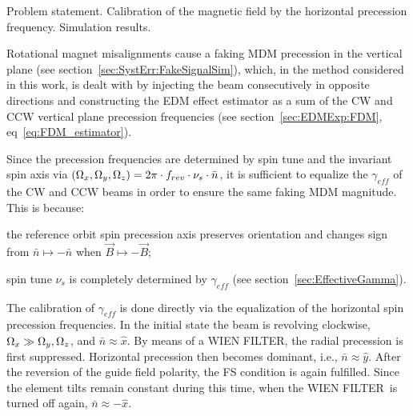 \documentclass{article}
\newcommand{\SUPPRESSOR}{WIEN FILTER}
\begin{document}
Problem statement. Calibration of the magnetic field by the horizontal precession frequency. Simulation results.
\newpage

Rotational magnet misalignments cause a faking MDM precession in the vertical plane (see section~\ref{sec:SystErr:FakeSignalSim}), which, in the method considered in this work, is dealt with by injecting the beam consecutively in opposite directions and constructing the EDM effect estimator as a sum of the CW and CCW vertical plane precession frequencies (see section~\ref{sec:EDMExp:FDM}, eq~\eqref{eq:FDM_estimator}).

Since the precession frequencies are determined by spin tune and the invariant spin axis via $(\Omega_x, \Omega_y, \Omega_z) = 2\pi\cdot f_{rev} \cdot \nu_s \cdot \bar n$, it is sufficient to equalize the $\gamma_{eff}$ of the CW and CCW beams in order to ensure the same faking MDM magnitude. This is because:
\begin{inparaenum}
\item the reference orbit spin precession axis preserves orientation and changes sign from $\bar n \mapsto -\bar n$ when $\vec B \mapsto -\vec B$;
\item spin tune $\nu_s$ is completely determined by $\gamma_{eff}$ (see section~\ref{sec:EffectiveGamma}).
\end{inparaenum}

The calibration of $\gamma_{eff}$ is done directly via the equalization of the horizontal spin precession frequencies. In the initial state the beam is revolving clockwise, $\Omega_x \gg \Omega_y, \Omega_z$, and $\bar n \approx \hat x$. By means of a \SUPPRESSOR, the radial precession is first suppressed. Horizontal precession then becomes dominant, i.e., $\bar n \approx \hat y$. After the reversion of the guide field polarity, the FS condition is again fulfilled. Since the element tilts remain constant during this time, when the \SUPPRESSOR~is turned off again, $\bar n \approx -\hat x$.
\end{document}
